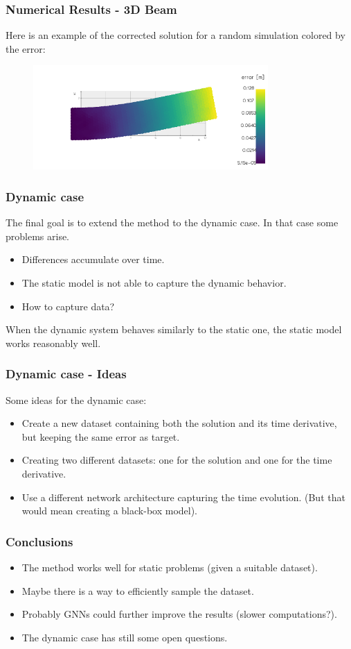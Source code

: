 \documentclass{beamer}
\begin{document}
\begin{frame}
    \frametitle{Numerical Results - 3D Beam}
    Here is an example of the corrected solution for a random simulation colored by the error:
    \begin{figure}
        \centering
        \includegraphics[width=0.8\textwidth]{Images/output_3D_beam.png}
    \end{figure}
\end{frame}

\begin{frame}
    \frametitle{Dynamic case}
    The final goal is to extend the method to the dynamic case. In that case some problems arise.
    \begin{itemize}
        \item Differences accumulate over time.
        \item The static model is not able to capture the dynamic behavior.
        \item How to capture data?
    \end{itemize}
    When the dynamic system behaves similarly to the static one, the static model works reasonably well.
\end{frame}

\begin{frame}
    \frametitle{Dynamic case - Ideas}
    Some ideas for the dynamic case:
    \begin{itemize}
        \item Create a new dataset containing both the solution and its time derivative, but keeping the same error as target.
        \item Creating two different datasets: one for the solution and one for the time derivative.
        \item Use a different network architecture capturing the time evolution. (But that would mean creating a black-box model).
    \end{itemize}
\end{frame}

\begin{frame}
    \frametitle{Conclusions}
    \begin{itemize}
        \item The method works well for static problems (given a suitable dataset).
        \item Maybe there is a way to efficiently sample the dataset.
        \item Probably GNNs could further improve the results (slower computations?).
        \item The dynamic case has still some open questions.
    \end{itemize}
\end{frame}
\end{document}
